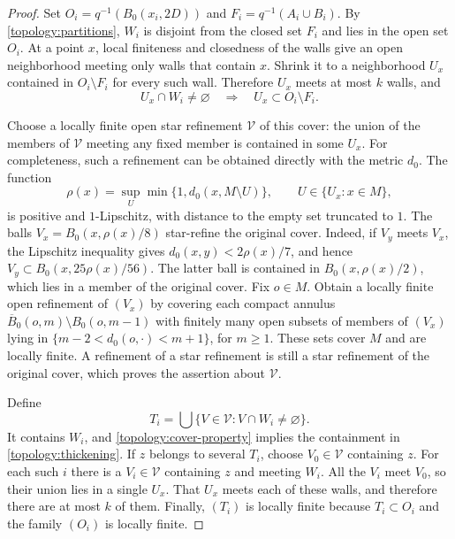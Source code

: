 \documentclass[11pt]{article}
\numberwithin{equation}{section}
\theoremstyle{definition}
\theoremstyle{remark}
\begin{document}
\begin{proof}
Set $O_i=q^{-1}(B_0(x_i,2D))$ and
$F_i=q^{-1}(A_i\cup B_i)$.  By
\cref{topology:partitions}, $W_i$ is disjoint from the closed set $F_i$
and lies in the open set $O_i$.  At a point $x$, local finiteness and
closedness of the walls give an open neighborhood meeting only walls
that contain $x$.  Shrink it to a neighborhood $U_x$ contained in
$O_i\setminus F_i$ for every such wall.  Therefore $U_x$ meets at most
$k$ walls, and
\begin{equation}\label{topology:cover-property}
 U_x\cap W_i\ne\varnothing\quad\Longrightarrow\quad
 U_x\subset O_i\setminus F_i.
\end{equation}

Choose a locally finite open star refinement $\mathcal V$ of this
cover: the union of the members of $\mathcal V$ meeting any fixed
member is contained in some $U_x$.  For completeness, such a refinement
can be obtained directly with the metric $d_0$.  The function
\[
 \rho(x)=\sup_U\min\{1,d_0(x,M\setminus U)\},
 \qquad U\in\{U_x:x\in M\},
\]
is positive and $1$-Lipschitz, with distance to the empty set truncated
to $1$.  The balls $V_x=B_0(x,\rho(x)/8)$ star-refine the original
cover.  Indeed, if $V_y$ meets $V_x$, the Lipschitz inequality gives
$d_0(x,y)<2\rho(x)/7$, and hence
$V_y\subset B_0(x,25\rho(x)/56)$.  The latter ball is contained in
$B_0(x,\rho(x)/2)$, which lies in a member of the original cover.
Fix $o\in M$.  Obtain a locally finite open refinement of $(V_x)$ by covering each
compact annulus
$\overline B_0(o,m)\setminus B_0(o,m-1)$ with finitely many open subsets
of members of $(V_x)$ lying in
$\{m-2<d_0(o,\cdot)<m+1\}$, for $m\ge1$.
These sets cover $M$ and are locally finite.  A refinement of a star
refinement is still a star refinement of the original cover, which
proves the assertion about $\mathcal V$.

Define
\[
 T_i=\bigcup\{V\in\mathcal V:V\cap W_i\ne\varnothing\}.
\]
It contains $W_i$, and \eqref{topology:cover-property} implies the
containment in \eqref{topology:thickening}.  If $z$ belongs to several
$T_i$, choose $V_0\in\mathcal V$ containing $z$.  For each such $i$
there is a $V_i\in\mathcal V$ containing $z$ and meeting $W_i$.
All the $V_i$ meet $V_0$, so their union lies in a single $U_x$.
That $U_x$ meets each of these walls, and therefore there are at most
$k$ of them.  Finally, $(T_i)$ is locally finite because $T_i\subset O_i$
and the family $(O_i)$ is locally finite.
\end{proof}
\end{document}
